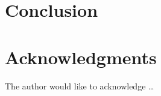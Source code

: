 \documentclass[sigconf,balance,nonacm,authordraft]{acmart}
\begin{document}
\section{Conclusion}
\label{sec:conclusion}




\section*{Acknowledgments}
The author would like to acknowledge \ldots



\end{document}
